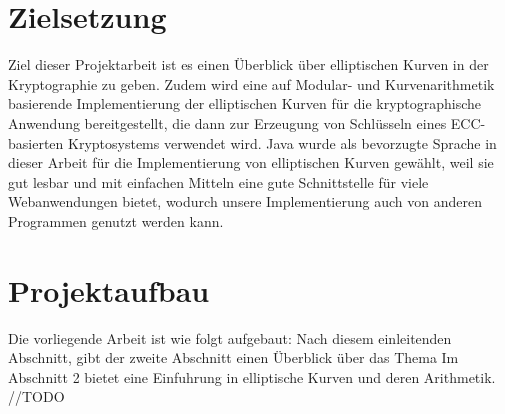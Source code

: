 \section{Zielsetzung}

Ziel dieser Projektarbeit ist es einen Überblick über elliptischen Kurven in der Kryptographie zu geben. 
Zudem wird eine auf Modular- und Kurvenarithmetik basierende Implementierung der elliptischen Kurven für die kryptographische Anwendung bereitgestellt, die dann zur  Erzeugung von Schlüsseln eines ECC-basierten Kryptosystems verwendet wird.
Java wurde als bevorzugte Sprache in dieser Arbeit für die Implementierung von elliptischen Kurven gewählt, weil sie gut lesbar und mit einfachen Mitteln eine gute Schnittstelle für viele Webanwendungen bietet, wodurch unsere Implementierung auch von anderen Programmen genutzt werden kann.

\section{Projektaufbau}


Die vorliegende Arbeit ist wie folgt aufgebaut: Nach diesem einleitenden Abschnitt, gibt der zweite Abschnitt einen Überblick über das Thema
Im Abschnitt 2 bietet eine Einfuhrung in elliptische Kurven und deren Arithmetik. //TODO
